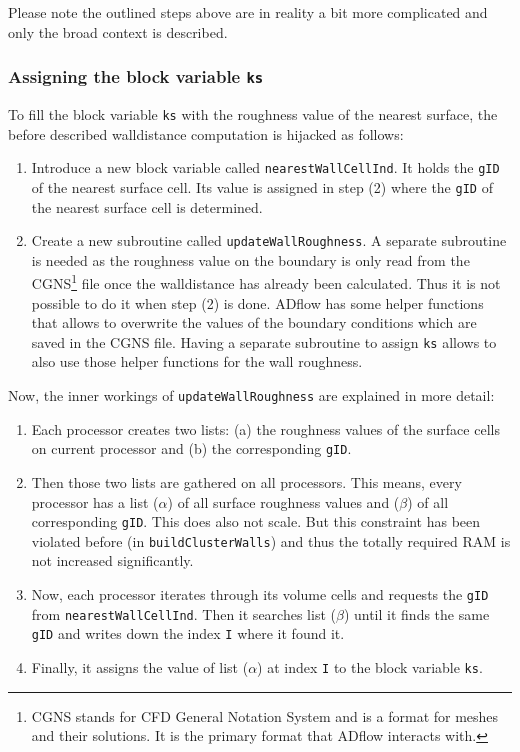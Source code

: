 \noindent Please note the outlined steps above are in reality a bit more
complicated and only the broad context is described.


\subsubsection{Assigning the block variable \texttt{ks}}
\label{subsubsec:propagate_ks}
To fill the block variable \texttt{ks} with the roughness value of the nearest
surface, the before described walldistance computation is hijacked as follows:

\begin{enumerate}[label=\Alph*]
  \item Introduce a new block variable called \texttt{nearestWallCellInd}. It
holds the \texttt{gID} of the nearest surface cell. Its value is assigned in
step (2) where the \texttt{gID} of the nearest surface cell is determined.

  \item Create a new subroutine called \texttt{updateWallRoughness}. A separate
subroutine is needed as the roughness value on the boundary is only read from
the CGNS\footnote{CGNS stands for CFD General Notation System and is a format
for meshes and their solutions. It is the primary format that ADflow interacts
with.} file once the walldistance has already been calculated. Thus it is not
possible to do it when step (2) is done. ADflow has some helper functions that
allows to overwrite the values of the boundary conditions which are saved in the
CGNS file. Having a separate subroutine to assign \texttt{ks} allows to also use
those helper functions for the wall roughness.
\end{enumerate}

\noindent Now, the inner workings of \texttt{updateWallRoughness} are explained
in more detail:

\begin{enumerate}[label=\Alph*]
  \item Each processor creates two lists: (a) the roughness values of the
surface cells on current processor and (b) the corresponding \texttt{gID}.

  \item Then those two lists are gathered on all processors. This means, every
processor has a list ($\alpha$) of all surface roughness values and ($\beta$) of
all corresponding \texttt{gID}. This does also not scale. But this constraint
has been violated before (in \texttt{buildClusterWalls}) and thus the totally
required RAM is not increased significantly.

\item Now, each processor iterates through its volume cells and requests the
\texttt{gID} from \texttt{nearestWallCellInd}. Then it searches list ($\beta$)
until it finds the same \texttt{gID} and writes down the index \texttt{I} where
it found it.

\item Finally, it assigns the value of list ($\alpha$) at index \texttt{I} to the
block variable \texttt{ks}.
\end{enumerate}


